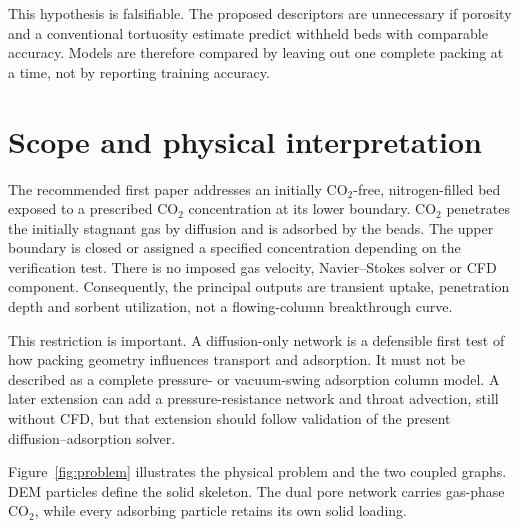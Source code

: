 \documentclass[12pt,a4paper]{article}
\begin{document}
This hypothesis is falsifiable. The proposed descriptors are unnecessary if
porosity and a conventional tortuosity estimate predict withheld beds with
comparable accuracy. Models are therefore compared by leaving out one complete
packing at a time, not by reporting training accuracy.

\section{Scope and physical interpretation}

The recommended first paper addresses an initially CO$_2$-free, nitrogen-filled
bed exposed to a prescribed CO$_2$ concentration at its lower boundary. CO$_2$
penetrates the initially stagnant gas by diffusion and is adsorbed by the beads.
The upper boundary is closed or assigned a specified concentration depending on
the verification test. There is no imposed gas velocity, Navier--Stokes solver
or CFD component. Consequently, the principal outputs are transient uptake,
penetration depth and sorbent utilization, not a flowing-column breakthrough
curve.

This restriction is important. A diffusion-only network is a defensible first
test of how packing geometry influences transport and adsorption. It must not
be described as a complete pressure- or vacuum-swing adsorption column model.
A later extension can add a pressure-resistance network and throat advection,
still without CFD, but that extension should follow validation of the present
diffusion--adsorption solver.

Figure~\ref{fig:problem} illustrates the physical problem and the two coupled
graphs. DEM particles define the solid skeleton. The dual pore network carries
gas-phase CO$_2$, while every adsorbing particle retains its own solid loading.
\end{document}
